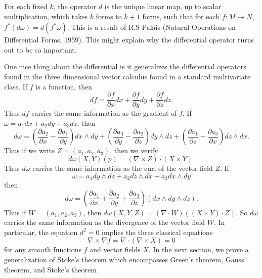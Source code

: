 For each fixed $k$, the operator $d$ is the unique linear map, up to scalar multiplication, which takes $k$ forms to $k+1$ forms, such that for each $f: M \to N$, $f^*(d\omega) = d(f^* \omega)$. This is a result of R.S Palais (Natural Operations on Differential Forms, 1959). This might explain why the differential operator turns out to be so important.

\begin{example}
    One nice thing about the differential is it generalizes the differential operators found in the three dimensional vector calculus found in a standard multivariate class. If $f$ is a function, then
    \[ df = \frac{\partial f}{\partial x} dx + \frac{\partial f}{\partial y} dy + \frac{\partial f}{\partial z} dz. \]
    Thus $df$ carries the same information as the gradient of $f$. If $\omega = a_1 dx + a_2 dy + a_3 dz$, then
    \[ d\omega = \left( \frac{\partial a_2}{\partial x} - \frac{\partial a_1}{\partial y} \right) dx \wedge dy + \left( \frac{\partial a_3}{\partial y} - \frac{\partial a_2}{\partial z} \right) dy \wedge dz + \left( \frac{\partial a_1}{\partial z} - \frac{\partial a_3}{\partial x} \right) dz \wedge dx. \]
    Thus if we write $Z = (a_1, a_2, a_3)$, then we verify
    \[ d\omega(X,Y)(p) = (\nabla \times Z) \cdot (X \times Y). \]
    Thus $d\omega$ carries the same information as the curl of the vector field $Z$. If
    \[ \omega = a_1 dy \wedge dz + a_2 dz \wedge dx + a_3 dx \wedge dy \]
    then
    \[ d\omega = \left(\frac{\partial a_1}{\partial x} + \frac{\partial a_2}{\partial y} + \frac{\partial a_3}{\partial z} \right) (dx \wedge dy \wedge dz). \]
    Thus if $W = (a_1, a_2, a_3)$, then $d\omega(X,Y,Z) = (\nabla \cdot W) ((X \times Y) \cdot Z)$. So $d\omega$ carries the same information as the divergence of the vector field $W$. In particular, the equation $d^2 = 0$ implies the three classical equations
    \[ \nabla \times \nabla f = \nabla \cdot (\nabla \times X) = 0 \]
    for any smooth functions $f$ and vector fields $X$. In the next section, we prove a generalization of Stoke's theorem which encompasses Green's theorem, Gauss' theorem, and Stoke's theorem.
\end{example}


